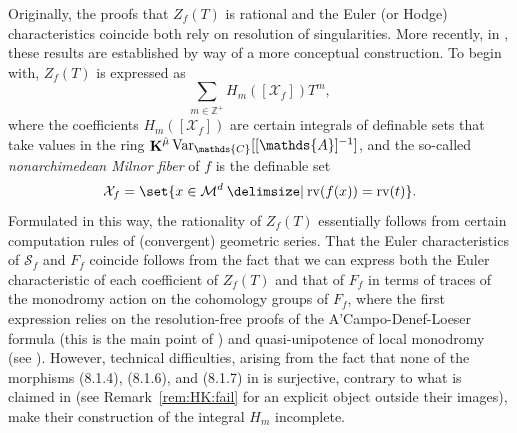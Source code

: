 \documentclass[12pt]{amsart}
\newcommand{\memph}[1]{{\color{magenta}\emph{#1}}}
\theoremstyle{plain}
\theoremstyle{definition}
\theoremstyle{remark}
\numberwithin{equation}{section}
\theoremstyle{plain}
\newcommand{\MM}{\mdl M}
\newcommand{\Z}{\mathds{Z}}
\newcommand{\A}{\mathds{A}}
\newcommand{\C}{\mathds{C}}
\newcommand{\0}{\emptyset}
\newcommand{\mdl}[1]{\mathcal{#1}}  %
\providecommand\given{}
\newcommand\SetSymbol[1][]{%
\nonscript \: #1 \vert
\allowbreak
\nonscript\:
\mathopen{}}
\renewcommand\given{\SetSymbol[\delimsize]}
\DeclareMathOperator{\rv}{rv}
\DeclareMathOperator{\ggk}{\mathbf{K}}
\newcommand{\var}{\textup{Var}}
\newcommand{\gmv}{\ggk^{\hat \mu}\var_{\C}}
\begin{document}
Originally,  the proofs that $Z_f(T)$ is rational and  the Euler (or Hodge) characteristics coincide both rely on resolution of singularities.  More recently, in \cite{hru:loe:lef}, these results are established by way of a more conceptual construction. To begin with, $Z_{f}(T)$ is expressed as
\begin{equation*}\label{intro:zeta:mot}
\sum_{m \in \Z^+} H_m([\mdl X_f]) T^m,
\end{equation*}
where the coefficients $H_m([\mdl X_f])$ are certain integrals of definable sets that take values in the ring $\gmv [[\A]^{-1}]$,  and the so-called \memph{nonarchimedean Milnor fiber} of $f$ is the definable set
\[
\mdl X_f = \set{x \in \MM^d \given \rv(f(x)) = \rv(t) }.
\]
Formulated in this way, the rationality of $Z_{f}(T)$ essentially follows from  certain computation rules of (convergent) geometric series. That the Euler characteristics of $\mathscr S_{f}$ and $F_{f}$ coincide follows from the fact that we can express both the Euler characteristic of each coefficient of $Z_{f}(T)$ and that of $F_{f}$ in terms of traces of the monodromy action on the cohomology groups of $F_{f}$, where the first expression relies on  the resolution-free proofs of the A'Campo-Denef-Loeser formula (this is the main point of \cite{hru:loe:lef}) and quasi-unipotence of local monodromy (see \cite[Remark~8.5.5]{hru:loe:lef}). However, technical difficulties, arising from the fact that none of the morphisms (8.1.4), (8.1.6), and (8.1.7) in \cite{hru:loe:lef} is surjective, contrary to what is claimed in \cite[Proposition~10.10(2)]{hrushovski:kazhdan:integration:vf} (see Remark~\ref{rem:HK:fail} for an explicit object outside their images), make their construction of the integral $H_m$ incomplete.
\end{document}
